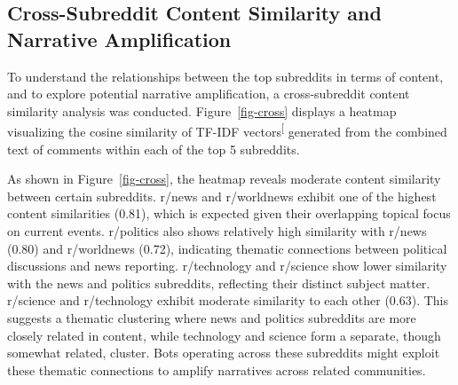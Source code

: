 \documentclass[
  12pt,
  letterpaper,
  DIV=11,
  numbers=noendperiod]{scrartcl}
\begin{document}
\subsection{Cross-Subreddit Content Similarity and Narrative
Amplification}\label{cross-subreddit-content-similarity-and-narrative-amplification}

To understand the relationships between the top subreddits in terms of
content, and to explore potential narrative amplification, a
cross-subreddit content similarity analysis was conducted.
Figure~\ref{fig-cross} displays a heatmap visualizing the cosine
similarity of TF-IDF
vectors\textsuperscript{{[}\citeproc{ref-salton1988term}{29}{]}}
generated from the combined text of comments within each of the top 5
subreddits.

As shown in Figure~\ref{fig-cross}, the heatmap reveals moderate content
similarity between certain subreddits. r/news and r/worldnews exhibit
one of the highest content similarities (0.81), which is expected given
their overlapping topical focus on current events. r/politics also shows
relatively high similarity with r/news (0.80) and r/worldnews (0.72),
indicating thematic connections between political discussions and news
reporting. r/technology and r/science show lower similarity with the
news and politics subreddits, reflecting their distinct subject matter.
r/science and r/technology exhibit moderate similarity to each other
(0.63). This suggests a thematic clustering where news and politics
subreddits are more closely related in content, while technology and
science form a separate, though somewhat related, cluster. Bots
operating across these subreddits might exploit these thematic
connections to amplify narratives across related communities.
\end{document}
